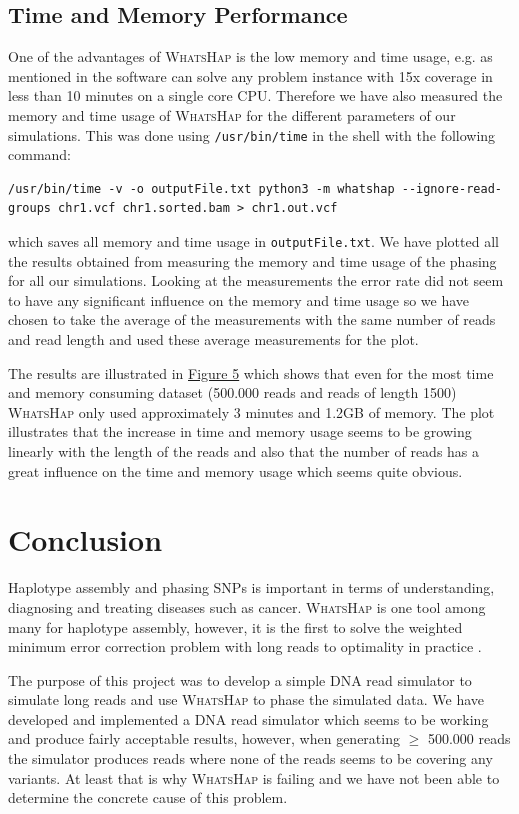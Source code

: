 \documentclass[10pt,a4paper]{article}
\begin{document}
\subsection{Time and Memory Performance}
One of the advantages of \textsc{WhatsHap} is the low memory and time usage, e.g. as mentioned in \cite{whatshap} the software can solve any problem instance with 15x coverage in less than 10 minutes on a single core CPU. Therefore we have also measured the memory and time usage of \textsc{WhatsHap} for the different parameters of our simulations. This was done using \texttt{/usr/bin/time} in the shell with the following command:
\begin{lstlisting}
/usr/bin/time -v -o outputFile.txt python3 -m whatshap --ignore-read-groups chr1.vcf chr1.sorted.bam > chr1.out.vcf
\end{lstlisting}
which saves all memory and time usage in \texttt{outputFile.txt}. We have plotted all the results obtained from measuring the memory and time usage of the phasing for all our simulations. Looking at the measurements the error rate did not seem to have any significant influence on the memory and time usage so we have chosen to take the average of the measurements with the same number of reads and read length and used these average measurements for the plot.

The results are illustrated in \hyperref[fig:performance]{Figure 5} which shows that even for the most time and memory consuming dataset (500.000 reads and reads of length 1500) \textsc{WhatsHap} only used approximately 3 minutes and 1.2GB of memory. The plot illustrates that the increase in time and memory usage seems to be growing linearly with the length of the reads and also that the number of reads has a great influence on the time and memory usage which seems quite obvious.

\section{Conclusion}
Haplotype assembly and phasing SNPs is important in terms of understanding, diagnosing and treating diseases such as cancer. \textsc{WhatsHap} is one tool among many for haplotype assembly, however, it is the first to solve the weighted minimum error correction problem with long reads to optimality in practice \cite{whatshap}.

The purpose of this project was to develop a simple DNA read simulator to simulate long reads and use \textsc{WhatsHap} to phase the simulated data. We have developed and implemented a DNA read simulator which seems to be working and produce fairly acceptable results, however, when generating $\geq$ 500.000 reads the simulator produces reads where none of the reads seems to be covering any variants. At least that is why \textsc{WhatsHap} is failing and we have not been able to determine the concrete cause of this problem.
\end{document}
